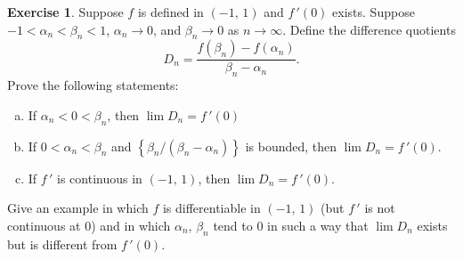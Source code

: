 \documentclass[12pt]{book}
\theoremstyle{definition}
\newtheorem{exercise}{Exercise}
\begin{document}
		\begin{exercise}
			Suppose $f$ is defined in $(-1,\,1)$ and $f\,'(0)$ exists. Suppose $-1<\alpha_n<\beta_n<1$, $\alpha_n\rightarrow 0$, and $\beta_n\rightarrow0$ as $n\rightarrow\infty$. Define the difference quotients
			\begin{equation*}
				D_n=\dfrac{f(\beta_n)-f(\alpha_n)}{\beta_n-\alpha_n}.
			\end{equation*}
			Prove the following statements:
			\begin{enumerate}[(a)]
				\item If $\alpha_n<0<\beta_n$, then $\lim D_n=f\,'(0)$
				\item If $0<\alpha_n<\beta_n$ and $\left\{\beta_n/(\beta_n-\alpha_n)\right\}$ is bounded, then $\lim D_n=f\,'(0)$.
				\item If $f\,'$ is continuous in $(-1,\,1)$, then $\lim D_n=f\,'(0)$.
			\end{enumerate}
			Give an example in which $f$ is differentiable in $(-1,\,1)$ (but $f\,'$ is not continuous at $0$) and in which $\alpha_n$, $\beta_n$ tend to $0$ in such a way that $\lim D_n$ exists but is different from $f\,'(0)$.
		\end{exercise}
\end{document}
